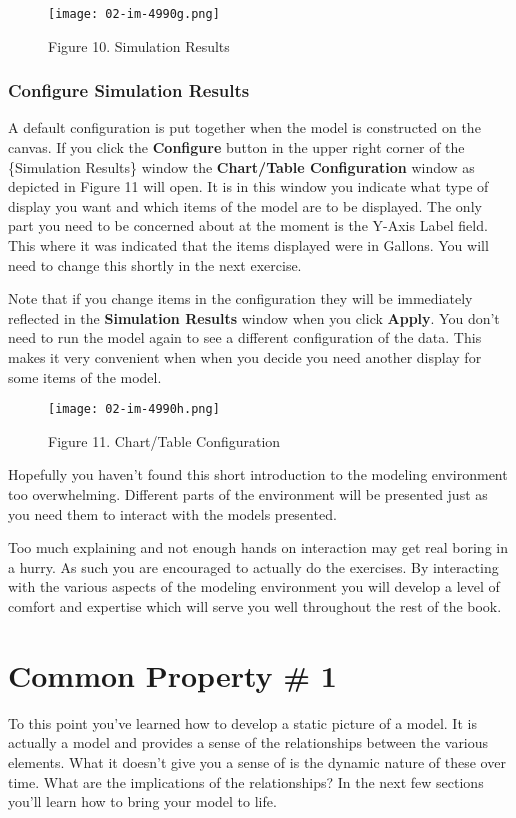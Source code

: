 \documentclass[]{memoir}
\let\Oldincludegraphics\includegraphics
\renewcommand{\includegraphics}[1]{\Oldincludegraphics[max size={\textwidth}{\textheight}]{#1}}
\renewcommand{\u}[1]{\textbf{#1}}
\begin{document}
\begin{figure}[htbp]
\centering
\texttt{[image: 02-im-4990g.png]}
\caption{Figure 10. Simulation Results}
\end{figure}

\subsubsection{Configure Simulation Results}

A default configuration is put together when the model is constructed on
the canvas. If you click the \u{Configure} button in the upper right
corner of the \{Simulation Results\} window the
\u{Chart/Table Configuration} window as depicted in Figure 11 will open.
It is in this window you indicate what type of display you want and
which items of the model are to be displayed. The only part you need to
be concerned about at the moment is the Y-Axis Label field. This where
it was indicated that the items displayed were in Gallons. You will need
to change this shortly in the next exercise.

Note that if you change items in the configuration they will be
immediately reflected in the \u{Simulation Results} window when you
click \u{Apply}. You don't need to run the model again to see a
different configuration of the data. This makes it very convenient when
when you decide you need another display for some items of the model.

\begin{figure}[htbp]
\centering
\texttt{[image: 02-im-4990h.png]}
\caption{Figure 11. Chart/Table Configuration}
\end{figure}

Hopefully you haven't found this short introduction to the modeling
environment too overwhelming. Different parts of the environment will be
presented just as you need them to interact with the models presented.

Too much explaining and not enough hands on interaction may get real
boring in a hurry. As such you are encouraged to actually do the
exercises. By interacting with the various aspects of the modeling
environment you will develop a level of comfort and expertise which will
serve you well throughout the rest of the book.

\section{Common Property \# 1}

To this point you've learned how to develop a static picture of a model.
It is actually a model and provides a sense of the relationships between
the various elements. What it doesn't give you a sense of is the dynamic
nature of these over time. What are the implications of the
relationships? In the next few sections you'll learn how to bring your
model to life.
\end{document}
